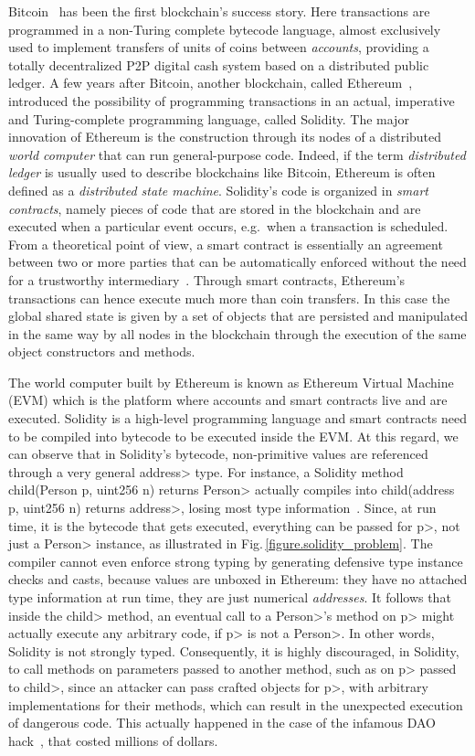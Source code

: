 Bitcoin~\cite{Nakamoto08,book-mastering-bitcoin}  has been the first blockchain's success story. Here transactions are programmed in a non-Turing complete bytecode language, almost exclusively used to implement transfers of units of coins between \emph{accounts}, providing a totally decentralized P2P digital cash system based on a distributed public ledger. 
%
A few years after Bitcoin, another blockchain, called Ethereum~\cite{Buterin13,AntonopoulosW18}, introduced the possibility of programming transactions in an actual, imperative and Turing-complete programming language, called Solidity. The major innovation of Ethereum is the construction through its nodes of a distributed \emph{world computer} that can run general-purpose code. Indeed, if the term \emph{distributed ledger} is usually used to describe blockchains like Bitcoin, Ethereum is often defined as a \emph{distributed state machine}. Solidity's code is organized in \emph{smart contracts}, namely pieces of code that are stored in the blockchain and are executed when a particular event occurs, e.g.\ when a transaction is scheduled. From a theoretical point of view, a smart contract is essentially an agreement between two or more parties that can be automatically enforced without the need for a trustworthy intermediary~\cite{ebp}. Through smart contracts, Ethereum's transactions can hence execute much more than coin transfers. In this case the global shared state is given by a set of objects that are persisted and manipulated in the same way by all nodes in the blockchain through the execution of the same object constructors and methods.

The world computer built by Ethereum is known as Ethereum Virtual Machine (EVM) which is the platform where accounts and smart contracts live and are executed.
Solidity is a high-level programming language and smart contracts need to be compiled into bytecode to be executed inside the EVM. At this regard, we can observe that in Solidity's bytecode, non-primitive values are referenced through a very general \<address> type. For instance, a Solidity method \<child(Person p, uint256 n) returns Person> actually compiles into \<child(address p, uint256 n) returns address>, losing most type information~\cite{CrafaPZ19}. Since, at run time, it is the bytecode that gets executed, everything can be passed for \<p>, not just a \<Person> instance, as illustrated in Fig.\,\ref{figure.solidity_problem}.
The compiler cannot even enforce strong typing by generating defensive type instance checks and casts, because values are unboxed in Ethereum: they have no attached type information at run time, they are just numerical \emph{addresses}. It follows that inside the \<child> method, an eventual call to a \<Person>'s method on \<p> might actually execute any arbitrary code, if \<p> is not a \<Person>. In other words, Solidity is not strongly typed. Consequently, it is highly discouraged, in Solidity, to call methods on parameters passed to another method, such as on \<p> passed to \<child>, since an attacker can pass crafted objects for \<p>, with arbitrary implementations for their methods, which can result in the unexpected execution of dangerous code. This actually happened in the case of the infamous DAO hack~\cite{dao16}, that costed millions of dollars.

